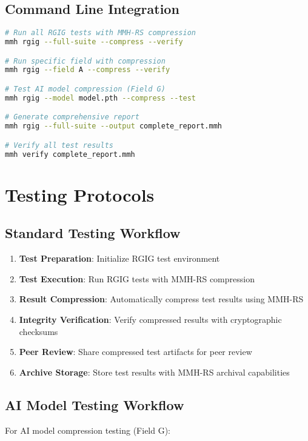 \documentclass[12pt,a4paper]{article}
\begin{document}
\subsection{Command Line Integration}
\begin{lstlisting}[language=bash, caption=Complete RGIG-MMH-RS Integration]
# Run all RGIG tests with MMH-RS compression
mmh rgig --full-suite --compress --verify

# Run specific field with compression
mmh rgig --field A --compress --verify

# Test AI model compression (Field G)
mmh rgig --model model.pth --compress --test

# Generate comprehensive report
mmh rgig --full-suite --output complete_report.mmh

# Verify all test results
mmh verify complete_report.mmh
\end{lstlisting}

\newpage

\section{Testing Protocols}

\subsection{Standard Testing Workflow}
\begin{enumerate}
    \item \textbf{Test Preparation}: Initialize RGIG test environment
    \item \textbf{Test Execution}: Run RGIG tests with MMH-RS compression
    \item \textbf{Result Compression}: Automatically compress test results using MMH-RS
    \item \textbf{Integrity Verification}: Verify compressed results with cryptographic checksums
    \item \textbf{Peer Review}: Share compressed test artifacts for peer review
    \item \textbf{Archive Storage}: Store test results with MMH-RS archival capabilities
\end{enumerate}

\subsection{AI Model Testing Workflow}
For AI model compression testing (Field G):
\end{document}
